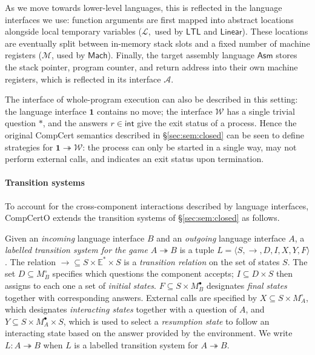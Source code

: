 \documentclass[acmsmall,authordraft]{acmart}
\newcommand{\kw}[1]{\ensuremath{ \mathsf{#1} }}
\newcommand{\que}{\circ}
\newcommand{\ans}{\bullet}
\begin{document}
As we move towards lower-level languages,
this is reflected in the language interfaces we use:
function arguments are first mapped into
abstract locations alongside local temporary variables
($\mathcal{L}$,~used by \kw{LTL} and \kw{Linear}).
These locations are eventually split between
in-memory stack slots and a fixed number of machine registers
($\mathcal{M}$, used by \kw{Mach}).
Finally, the target assembly language \kw{Asm}
stores the stack pointer, program counter,
and return address into their own machine registers,
which is reflected in its interface $\mathcal{A}$.

The interface of whole-program execution
can also be described in this setting:
the language interface $\mathbf{1}$ contains no move;
the interface $\mathcal{W}$ has a single trivial question $*$,
and the answers $r \in \kw{int}$
give the exit status of a process.
Hence the original CompCert semantics described in
\S\ref{sec:sem:closed}
can be seen to define strategies for
$\mathbf{1} \twoheadrightarrow \mathcal{W}$:
the process can only be started in a single way,
may not perform external calls,
and indicates an exit status upon termination.


\paragraph{Transition systems} %

To account for the cross-component interactions
described by language interfaces,
CompCertO extends
the transition systems of \S\ref{sec:sem:closed}
as follows.

\begin{definition} \label{def:lts}
Given an \emph{incoming} language interface $B$
and an \emph{outgoing} language interface $A$,
a \emph{labelled transition system for the game $A \twoheadrightarrow B$}
is a tuple $L = \langle S, \rightarrow, D, I, X, Y, F \rangle$.
The relation
${\rightarrow} \subseteq S \times \mathbb{E}^* \times S$ is
a \emph{transition relation} on the set of states $S$.
The set $D \subseteq M_B^\que$ specifies which
questions the component accepts;
$I \subseteq D \times S$ then
assigns to each one a set of \emph{initial states}.
$F \subseteq S \times M_B^\ans$
designates \emph{final states} together with corresponding answers.
External calls are specified by
$X \subseteq S \times M_A^\que$,
which designates \emph{interacting states} together with
a question of $A$, and
$Y \subseteq S \times M_A^\ans \times S$,
which is used to select a \emph{resumption state}
to follow an interacting state
based on the answer provided by the environment.
We write $L : A \twoheadrightarrow B$ when
$L$ is a labelled transition system for $A \twoheadrightarrow B$.
\end{definition}
\end{document}
